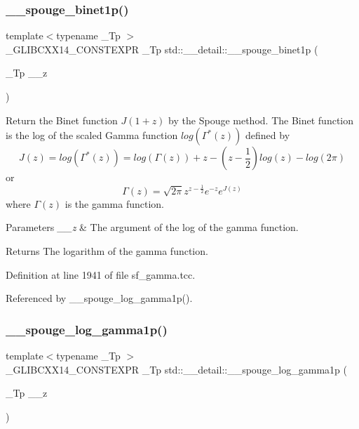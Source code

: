 \subsubsection{\texorpdfstring{\+\_\+\+\_\+spouge\+\_\+binet1p()}{\_\_spouge\_binet1p()}}
{\footnotesize\ttfamily template$<$typename \+\_\+\+Tp $>$ \\
\+\_\+\+G\+L\+I\+B\+C\+X\+X14\+\_\+\+C\+O\+N\+S\+T\+E\+X\+PR \+\_\+\+Tp std\+::\+\_\+\+\_\+detail\+::\+\_\+\+\_\+spouge\+\_\+binet1p (\begin{DoxyParamCaption}\item[{\+\_\+\+Tp}]{\+\_\+\+\_\+z }\end{DoxyParamCaption})}



Return the Binet function $ J(1+z) $ by the Spouge method. The Binet function is the log of the scaled Gamma function $ log(\Gamma^*(z)) $ defined by \[ J(z) = log(\Gamma^*(z)) = log\left(\Gamma(z)\right) + z - \left(z-\frac{1}{2}\right) log(z) - log(2\pi) \] or \[ \Gamma(z) = \sqrt{2\pi}z^{z-\frac{1}{2}}e^{-z}e^{J(z)} \] where $ \Gamma(z) $ is the gamma function. 


\begin{DoxyParams}{Parameters}
{\em \+\_\+\+\_\+z} & The argument of the log of the gamma function. \\
\hline
\end{DoxyParams}
\begin{DoxyReturn}{Returns}
The logarithm of the gamma function. 
\end{DoxyReturn}


Definition at line 1941 of file sf\+\_\+gamma.\+tcc.



Referenced by \+\_\+\+\_\+spouge\+\_\+log\+\_\+gamma1p().

\mbox{\label{namespacestd_1_1____detail_a29cdf96d3726e15cb0652736971ba5a9}} 
\subsubsection{\texorpdfstring{\+\_\+\+\_\+spouge\+\_\+log\+\_\+gamma1p()}{\_\_spouge\_log\_gamma1p()}}
{\footnotesize\ttfamily template$<$typename \+\_\+\+Tp $>$ \\
\+\_\+\+G\+L\+I\+B\+C\+X\+X14\+\_\+\+C\+O\+N\+S\+T\+E\+X\+PR \+\_\+\+Tp std\+::\+\_\+\+\_\+detail\+::\+\_\+\+\_\+spouge\+\_\+log\+\_\+gamma1p (\begin{DoxyParamCaption}\item[{\+\_\+\+Tp}]{\+\_\+\+\_\+z }\end{DoxyParamCaption})}



